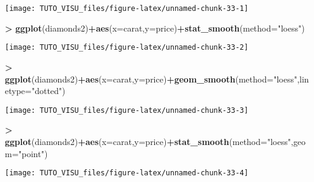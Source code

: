 \documentclass[]{article}
\newenvironment{Shaded}{\begin{snugshade}}{\end{snugshade}}
\newcommand{\DataTypeTok}[1]{\textcolor[rgb]{0.13,0.29,0.53}{#1}}
\newcommand{\KeywordTok}[1]{\textcolor[rgb]{0.13,0.29,0.53}{\textbf{#1}}}
\newcommand{\NormalTok}[1]{#1}
\newcommand{\OperatorTok}[1]{\textcolor[rgb]{0.81,0.36,0.00}{\textbf{#1}}}
\newcommand{\StringTok}[1]{\textcolor[rgb]{0.31,0.60,0.02}{#1}}
\theoremstyle{definition}
\theoremstyle{definition}
\theoremstyle{definition}
\theoremstyle{remark}
\begin{document}
\begin{center}\texttt{[image: TUTO\_VISU\_files/figure-latex/unnamed-chunk-33-1]} \end{center}

\begin{Shaded}
\begin{Highlighting}[]
\OperatorTok{>}\StringTok{ }\KeywordTok{ggplot}\NormalTok{(diamonds2)}\OperatorTok{+}\KeywordTok{aes}\NormalTok{(}\DataTypeTok{x=}\NormalTok{carat,}\DataTypeTok{y=}\NormalTok{price)}\OperatorTok{+}\KeywordTok{stat_smooth}\NormalTok{(}\DataTypeTok{method=}\StringTok{"loess"}\NormalTok{)}
\end{Highlighting}
\end{Shaded}

\begin{center}\texttt{[image: TUTO\_VISU\_files/figure-latex/unnamed-chunk-33-2]} \end{center}

\begin{Shaded}
\begin{Highlighting}[]
\OperatorTok{>}\StringTok{ }\KeywordTok{ggplot}\NormalTok{(diamonds2)}\OperatorTok{+}\KeywordTok{aes}\NormalTok{(}\DataTypeTok{x=}\NormalTok{carat,}\DataTypeTok{y=}\NormalTok{price)}\OperatorTok{+}\KeywordTok{geom_smooth}\NormalTok{(}\DataTypeTok{method=}\StringTok{"loess"}\NormalTok{,}\DataTypeTok{linetype=}\StringTok{"dotted"}\NormalTok{)}
\end{Highlighting}
\end{Shaded}

\begin{center}\texttt{[image: TUTO\_VISU\_files/figure-latex/unnamed-chunk-33-3]} \end{center}

\begin{Shaded}
\begin{Highlighting}[]
\OperatorTok{>}\StringTok{ }\KeywordTok{ggplot}\NormalTok{(diamonds2)}\OperatorTok{+}\KeywordTok{aes}\NormalTok{(}\DataTypeTok{x=}\NormalTok{carat,}\DataTypeTok{y=}\NormalTok{price)}\OperatorTok{+}\KeywordTok{stat_smooth}\NormalTok{(}\DataTypeTok{method=}\StringTok{"loess"}\NormalTok{,}\DataTypeTok{geom=}\StringTok{"point"}\NormalTok{)}
\end{Highlighting}
\end{Shaded}

\begin{center}\texttt{[image: TUTO\_VISU\_files/figure-latex/unnamed-chunk-33-4]} \end{center}
\end{document}
